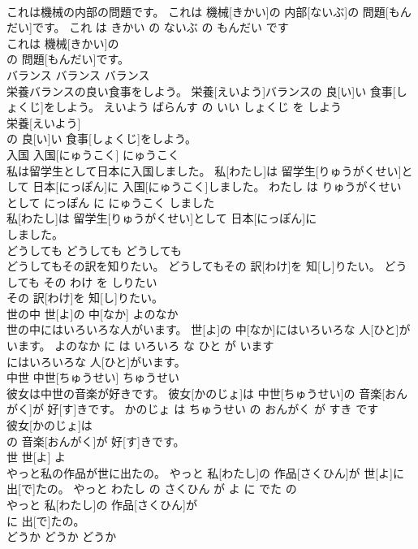 \documentclass[8pt]{extreport}
\begin{document}
\begin{CJK}{UTF8}{min}
\\	これは機械の内部の問題です。	これは 機械[きかい]の 内部[ないぶ]の 問題[もんだい]です。	これ は きかい の ないぶ の もんだい です	
\\	これは 機械[きかい]の
\\	の 問題[もんだい]です。			
\\	バランス	バランス	バランス	
\\	栄養バランスの良い食事をしよう。	栄養[えいよう]バランスの 良[い]い 食事[しょくじ]をしよう。	えいよう ばらんす の いい しょくじ を しよう	
\\	栄養[えいよう]
\\	の 良[い]い 食事[しょくじ]をしよう。			
\\	入国	入国[にゅうこく]	にゅうこく	
\\	私は留学生として日本に入国しました。	私[わたし]は 留学生[りゅうがくせい]として 日本[にっぽん]に 入国[にゅうこく]しました。	わたし は りゅうがくせい として にっぽん に にゅうこく しました	
\\	私[わたし]は 留学生[りゅうがくせい]として 日本[にっぽん]に
\\	しました。			
\\	どうしても	どうしても	どうしても	
\\	どうしてもその訳を知りたい。	どうしてもその 訳[わけ]を 知[し]りたい。	どうしても その わけ を しりたい	
\\	その 訳[わけ]を 知[し]りたい。			
\\	世の中	世[よ]の 中[なか]	よのなか	
\\	世の中にはいろいろな人がいます。	世[よ]の 中[なか]にはいろいろな 人[ひと]がいます。	よのなか に は いろいろ な ひと が います	
\\	にはいろいろな 人[ひと]がいます。			
\\	中世	中世[ちゅうせい]	ちゅうせい	
\\	彼女は中世の音楽が好きです。	彼女[かのじょ]は 中世[ちゅうせい]の 音楽[おんがく]が 好[す]きです。	かのじょ は ちゅうせい の おんがく が すき です	
\\	彼女[かのじょ]は
\\	の 音楽[おんがく]が 好[す]きです。			
\\	世	世[よ]	よ	
\\	やっと私の作品が世に出たの。	やっと 私[わたし]の 作品[さくひん]が 世[よ]に 出[で]たの。	やっと わたし の さくひん が よ に でた の	
\\	やっと 私[わたし]の 作品[さくひん]が
\\	に 出[で]たの。			
\\	どうか	どうか	どうか	

\end{CJK}
\end{document}
